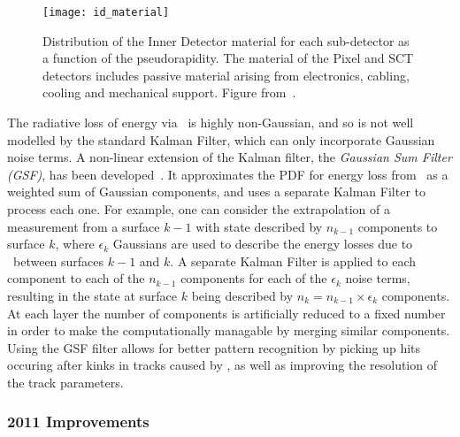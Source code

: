 \begin{figure}[h]
\centering
            \texttt{[image: id\_material]}
\caption{
Distribution of the Inner Detector material for each sub-detector as a
function of the pseudorapidity. The material of the Pixel and SCT detectors
includes passive material arising from electronics, cabling, cooling and
mechanical support. Figure from~\cite{ATLAS-CONF-2012-047}.}
\label{fig:id-material}
\end{figure}


The radiative loss of energy via \brem\ is highly non-Gaussian, and so is not
well modelled by the standard Kalman Filter, which can only incorporate Gaussian
noise terms. A non-linear extension of the
Kalman filter, the {\it Gaussian Sum Filter (GSF)}, has been
developed~\cite{Fruhwirth2003131,Atkinson:1448253}. It
approximates the PDF for energy loss from \brem\ as a weighted sum of Gaussian
components, and uses a separate Kalman Filter to process each one. For example,
one can consider the extrapolation of a measurement from a surface $k-1$ with state
described by $n_{k-1}$ components to surface $k$, where $\epsilon_{k}$ Gaussians
are used to describe the energy losses due to \brem\ between surfaces $k-1$ and
$k$. A separate Kalman Filter is applied to each component to each of the $n_{k-1}$
components for each of the $\epsilon_{k}$ noise terms, resulting in the state at
surface $k$ being described by $n_{k} = n_{k-1} \times \epsilon_{k}$ components.
At each layer the number of components is artificially reduced to a fixed number
in order to make the computationally managable by merging similar components.
Using the GSF filter allows for better pattern recognition by picking up hits
occuring after kinks in tracks caused by \brem, as well as improving the
resolution of the track parameters.

\subsubsection{2011 Improvements}

